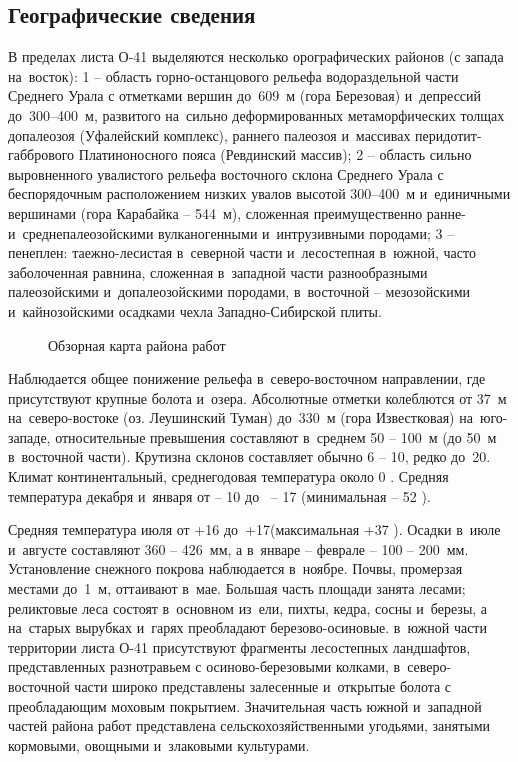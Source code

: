\subsection*{Географические сведения}
В пределах листа О-41 выделяются несколько орографических районов (с запада на~восток): 1 -- область горно-останцового рельефа водораздельной части Среднего Урала с отметками вершин до~609~м (гора Березовая) и~депрессий до~300--400~м, развитого на~сильно деформированных метаморфических толщах допалеозоя (Уфалейский комплекс), раннего палеозоя и~массивах перидотит-габбрового Платиноносного пояса (Ревдинский массив); 2 -- область сильно выровненного увалистого рельефа восточного склона Среднего Урала с беспорядочным расположением низких
увалов высотой 300--400~м и~единичными вершинами (гора Карабайка -- 544~м), сложенная преимущественно ранне- и~среднепалеозойскими вулканогенными и~интрузивными породами; 3  --  пенеплен: таежно-лесистая в~северной части и~лесостепная в~южной, часто заболоченная равнина, сложенная в~западной части разнообразными палеозойскими и~допалеозойскими породами, в~восточной  --  мезозойскими и~кайнозойскими осадками чехла Западно-Сибирской плиты. 
\begin{figure}[h]
	\caption{Обзорная карта района работ}
\end{figure}
Наблюдается общее понижение рельефа в~северо-восточном направлении, где присутствуют крупные болота и~озера. Абсолютные отметки колеблются от 37~м на~северо-востоке (оз. Леушинский Туман) до~330~м (гора Известковая) на~юго-западе, относительные превышения составляют в~среднем 50 -- 100~м (до 50~м в~восточной части). Крутизна склонов составляет обычно 6 -- 10\degree, редко до~20\degree.
Климат континентальный, среднегодовая температура около 0 . Средняя температура декабря и~января от  -- 10 до~ -- 17  (минимальная  -- 52 ).

Средняя температура июля от +16 до~+17\degree (максимальная +37 ). Осадки в~июле и~августе составляют 360 -- 426~мм, а в~январе -- феврале  --  100 -- 200~мм.
Установление снежного покрова наблюдается в~ноябре. Почвы, промерзая местами до~1~м, оттаивают в~мае. Большая часть площади занята лесами; реликтовые леса состоят в~основном из~ели, пихты, кедра, сосны и~березы, а на~старых вырубках и~гарях преобладают березово-осиновые. в~южной части территории листа О-41 присутствуют фрагменты лесостепных ландшафтов, представленных разнотравьем с осиново-березовыми колками, в~северо-восточной части широко представлены залесенные и~открытые болота с преобладающим моховым покрытием. Значительная часть южной и~западной частей района работ представлена сельскохозяйственными угодьями, занятыми кормовыми, овощными и~злаковыми культурами. 

